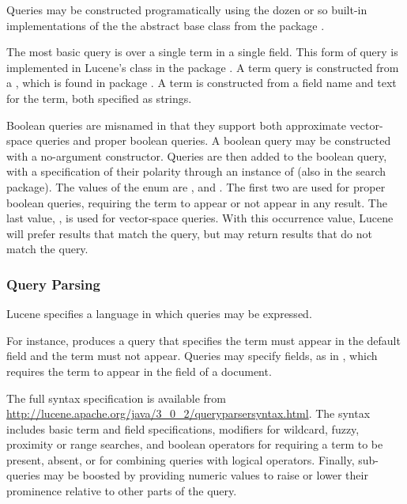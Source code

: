 Queries may be constructed programatically using the dozen or so
built-in implementations of the the  abstract base class
from the package .  

The most basic query is over a single term in a single field.  This
form of query is implemented in Lucene's  class in the
package .  A term query is constructed
from a , which is found in package
.  A term is constructed from a field
name and text for the term, both specified as strings.

Boolean queries are misnamed in that they support both approximate
vector-space queries and proper boolean queries.  A boolean query may
be constructed with a no-argument constructor.  Queries are then added
to the boolean query, with a specification of their polarity through
an instance of  (also in the search
package).  The values of the  enum are ,
 and .  The first two are used for proper
boolean queries, requiring the term to appear or not appear in any
result.  The last value, , is used for vector-space
queries.  With this occurrence value, Lucene will prefer results that
match the query, but may return results that do not match the query.

\subsubsection{Query Parsing}

Lucene specifies a language in which queries may be expressed.  

For instance,  produces a query that specifies
the term  must appear in the default field and
the term  must not appear.  Queries may specify
fields, as in , which requires the term
 to appear in the  field of a document.

The full syntax specification is available from
\url{http://lucene.apache.org/java/3_0_2/queryparsersyntax.html}.  The
syntax includes basic term and field specifications, modifiers for
wildcard, fuzzy, proximity or range searches, and boolean operators
for requiring a term to be present, absent, or for combining queries
with logical operators.  Finally, sub-queries may be boosted by providing
numeric values to raise or lower their prominence relative to other
parts of the query.


